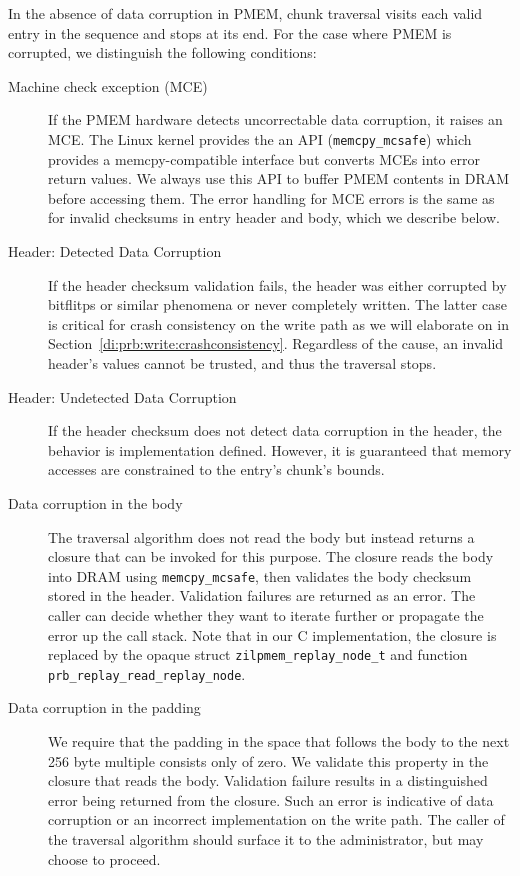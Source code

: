 \documentclass[12pt,a4paper,twoside]{book}
\begin{document}
In the absence of data corruption in PMEM, chunk traversal visits each valid entry in the sequence and stops at its end.
For the case where PMEM is corrupted, we distinguish the following conditions:
\begin{description}
    \item[Machine check exception (MCE)] If the PMEM hardware detects uncorrecta\-ble data corruption, it raises an MCE.
        The Linux kernel provides the an API (\lstinline{memcpy_mcsafe}) which provides a memcpy-compatible interface but converts MCEs into error return values.
        We always use this API to buffer PMEM contents in DRAM before accessing them.
        The error handling for MCE errors is the same as for invalid checksums in entry header and body, which we describe below.
    \item[Header: Detected Data Corruption]
        If the header checksum validation fails, the header was either corrupted by bitflitps or similar phenomena or never completely written.
        The latter case is critical for crash consistency on the write path as we will elaborate on in Section~\ref{di:prb:write:crashconsistency}.
        Regardless of the cause, an invalid header's values cannot be trusted, and thus the traversal stops.
    \item[Header: Undetected Data Corruption]
        If the header checksum does not detect data corruption in the header, the behavior is implementation defined.
        However, it is guaranteed that memory accesses are constrained to the entry's chunk's bounds.
    \item[Data corruption in the body]
        The traversal algorithm does not read the body but instead returns a closure that can be invoked for this purpose.
        The closure reads the body into DRAM using \lstinline{memcpy_mcsafe}, then validates the body checksum stored in the header.
        Validation failures are returned as an error.
        The caller can decide whether they want to iterate further or propagate the error up the call stack.
        Note that in our C implementation, the closure is replaced by the opaque struct \lstinline{zilpmem_replay_node_t} and function \lstinline{prb_replay_read_replay_node}.
    \item[Data corruption in the padding]
        We require that the padding in the space that follows the body to the next 256 byte multiple consists only of zero.
        We validate this property in the closure that reads the body.
        Validation failure results in a distinguished error being returned from the closure.
        Such an error is indicative of data corruption or an incorrect implementation on the write path.
        The caller of the traversal algorithm should surface it to the administrator, but may choose to proceed.
\end{description}
\end{document}
